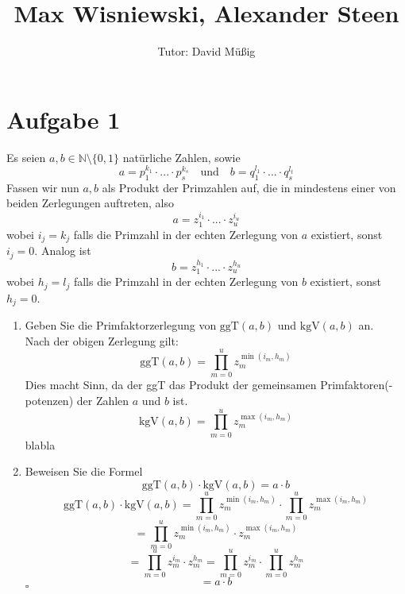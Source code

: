 \documentclass[11pt,a4paper,ngerman]{article}
\author{Tutor: David Müßig}
\date{}
\title{Max Wisniewski, Alexander Steen}
\newcommand{\N}{\mathbb{N}}
\newcommand{\ggT}{\text{ggT}}
\newcommand{\kgV}{\text{kgV}}
\begin{document}

\maketitle
\thispagestyle{fancy}


\section*{Aufgabe 1}

Es seien $a,b \in \N \setminus \{ 0,1 \}$ natürliche Zahlen, sowie
$$
a= p_1^{k_1}\cdot ...\cdot p_s^{k_s} \quad \text{und} \quad b = q_1^{l_1} \cdot ... \cdot q_s^{l_t}
$$
Fassen wir nun $a, b$ als Produkt der Primzahlen auf, die in mindestens einer von beiden Zerlegungen auftreten, also
$$ a= z_1^{i_1}\cdot ...\cdot z_u^{i_u} $$
wobei $i_j = k_j $ falls die Primzahl in der echten Zerlegung von $a$ existiert, sonst $i_j = 0$. Analog ist
$$ b = z_1^{h_1}\cdot ...\cdot z_u^{h_u} $$
wobei $h_j = l_j $ falls die Primzahl in der echten Zerlegung von $b$ existiert, sonst $h_j = 0$.
\begin{enumerate}[\bfseries a)]
\item Geben Sie die Primfaktorzerlegung von $\ggT (a,b)$ und $\kgV (a,b)$ an.\\
Nach der obigen Zerlegung gilt:
$$ \ggT(a,b) = \prod_{m=0}^{u} z_m^{\min{(i_m,h_m)}}$$
Dies macht Sinn, da der ggT das Produkt der gemeinsamen Primfaktoren(-potenzen) der Zahlen $a$ und $b$ ist. 
$$ \kgV(a,b) = \prod_{m=0}^{u} z_m^{\max{(i_m,h_m)}}$$
blabla
\item Beweisen Sie die Formel
$$ \ggT (a,b) \cdot \kgV (a,b) = a \cdot b $$
$$ \ggT (a,b) \cdot \kgV (a,b) = \prod_{m=0}^{u} z_m^{\min{(i_m,h_m)}} \cdot \prod_{m=0}^{u} z_m^{\max{(i_m,h_m)}} $$
$$ = \prod_{m=0}^{u} z_m^{\min{(i_m,h_m)}} \cdot z_m^{\max{(i_m,h_m)}} $$
$$ = \prod_{m=0}^{u} z_m^{i_m} \cdot z_m^{h_m} = \prod_{m=0}^{u} z_m^{i_m} \cdot \prod_{m=0}^{u} z_m^{h_m} $$
$$ = a \cdot b $$
\mbox{} \hfill $\square$
\end{enumerate}
\end{document}
